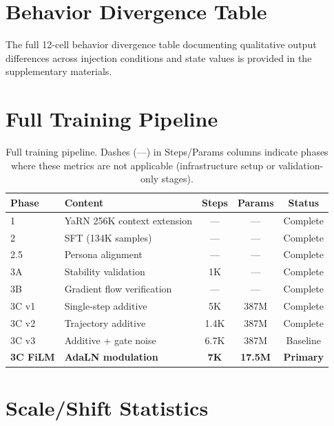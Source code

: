\documentclass[11pt,a4paper]{article}
\begin{document}
\appendix

\section{Behavior Divergence Table}

The full 12-cell behavior divergence table documenting qualitative output differences
across injection conditions and state values is provided in the supplementary
materials.

\section{Full Training Pipeline}

\begin{table}[H]
\centering
\begin{tabular}{llccc}
\toprule
\textbf{Phase} & \textbf{Content} & \textbf{Steps} & \textbf{Params} & \textbf{Status} \\
\midrule
1              & YaRN 256K context extension & ---  & ---    & Complete \\
2              & SFT (134K samples)          & ---  & ---    & Complete \\
2.5            & Persona alignment           & ---  & ---    & Complete \\
3A             & Stability validation        & 1K   & ---    & Complete \\
3B             & Gradient flow verification  & ---  & ---    & Complete \\
3C v1          & Single-step additive        & 5K   & 387M   & Complete \\
3C v2          & Trajectory additive         & 1.4K & 387M   & Complete \\
3C v3          & Additive + gate noise       & 6.7K & 387M   & Baseline \\
\textbf{3C FiLM} & \textbf{AdaLN modulation} & \textbf{7K} & \textbf{17.5M} & \textbf{Primary} \\
\bottomrule
\end{tabular}
\caption{Full training pipeline. Dashes (---) in Steps/Params columns indicate phases where these metrics are not applicable (infrastructure setup or validation-only stages).}
\end{table}

\section{Scale/Shift Statistics}
\end{document}
